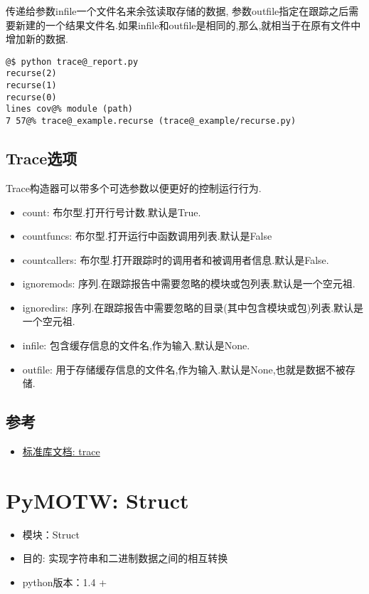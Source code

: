 \documentclass[a4paper,10pt,english]{manual}
\begin{document}
传递给参数infile一个文件名来余弦读取存储的数据, 参数outfile指定在跟踪之后需要新建的一个结果文件名.如果infile和outfile是相同的,那么,就相当于在原有文件中增加新的数据.

\begin{Verbatim}[commandchars=@\[\]]
@$ python trace@_report.py
recurse(2)
recurse(1)
recurse(0)
lines cov@% module (path)
7 57@% trace@_example.recurse (trace@_example/recurse.py)
\end{Verbatim}


\section{Trace选项}

Trace构造器可以带多个可选参数以便更好的控制运行行为.
\begin{itemize}
\item {} 
count:        布尔型.打开行号计数.默认是True.

\item {} 
countfuncs:   布尔型.打开运行中函数调用列表.默认是False

\item {} 
countcallers: 布尔型.打开跟踪时的调用者和被调用者信息.默认是False.

\item {} 
ignoremods:   序列.在跟踪报告中需要忽略的模块或包列表.默认是一个空元祖.

\item {} 
ignoredirs:   序列.在跟踪报告中需要忽略的目录(其中包含模块或包)列表.默认是一个空元祖.

\item {} 
infile:       包含缓存信息的文件名,作为输入.默认是None.

\item {} 
outfile:      用于存储缓存信息的文件名,作为输入.默认是None,也就是数据不被存储.

\end{itemize}


\section{参考}
\begin{itemize}
\item {} 
\href{http://docs.python.org/library/trace.html}{标准库文档: trace}

\end{itemize}

\resetcurrentobjects


\chapter{PyMOTW: Struct}
\begin{itemize}
\item {} 
模块：Struct

\item {} 
目的: 实现字符串和二进制数据之间的相互转换

\item {} 
python版本：1.4 +

\end{itemize}
\end{document}
